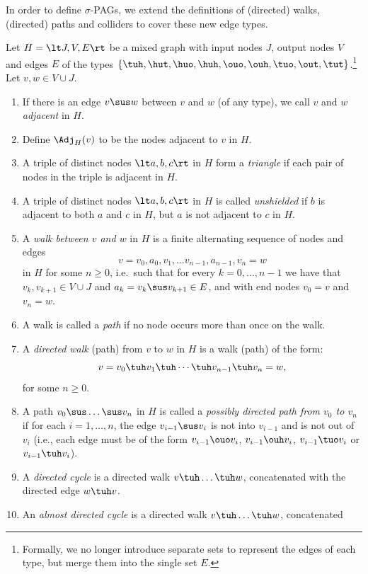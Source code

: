 In order to define $\sigma$-PAGs, we extend the definitions of (directed) walks, (directed) paths and colliders to cover these new edge types.
\begin{Def}\label{def:more_walks}
  Let $H=\lt J,V,E \rt$ be a mixed graph with input nodes $J$, output nodes $V$ and edges $E$ of the types $\{\tuh,\hut,\huo,\huh,\ouo,\ouh,\tuo,\out,\tut\}$.\footnote{Formally, we no longer introduce separate sets to represent the edges of each type, but merge them into the single set $E$.}
  Let $v,w \in V \cup J$.
  \begin{enumerate}
    \item If there is an edge $v \sus w$ between $v$ and $w$ (of any type), we call $v$ and $w$ \emph{adjacent} in $H$.
    \item Define $\Adj_H(v)$ to be the nodes adjacent to $v$ in $H$.
    \item A triple of distinct nodes $\lt a,b,c \rt$ in $H$ form a \emph{triangle} if each pair of nodes in the triple is adjacent in $H$.
    \item A triple of distinct nodes $\lt a,b,c \rt$ in $H$ is called \emph{unshielded} if $b$ is adjacent to both $a$ and $c$ in $H$, but $a$ is not adjacent to $c$ in $H$.
    \item A \emph{walk between $v$ and $w$} in $H$ is a finite alternating sequence of nodes and edges 
        \[v=v_0, a_0, v_1, \dots v_{n-1}, a_{n-1}, v_n=w\] 
        in $H$ for some $n \ge 0$, i.e.\ such that for every $k=0,\dots,n-1$ 
        we have that $v_{k},v_{k+1} \in V \cup J$ and $a_k = v_k \sus v_{k+1} \in E$, and with end nodes $v_0=v$ and $v_n=w$.
    \item A walk is called a \emph{path} if no node occurs more than once on the walk.
    \item A \emph{directed walk} (path) from $v$ to $w$ in $H$ is a walk (path) of the form:
        \[v=v_0 \tuh v_1 \tuh  \cdots \tuh v_{n-1} \tuh v_n=w,\]
        for some $n \ge 0$.
    \item A path $v_0 \sus \dots \sus v_n$ in $H$ is called a \emph{possibly directed path from $v_0$ to $v_n$} if for each $i=1,\dots,n$, the edge $v_{i-1} \sus v_i$ is not into $v_{i-1}$ and is not out of $v_i$ (i.e., each edge must be of the form $v_{i-1} \ouo v_i$, $v_{i-1} \ouh v_i$, $v_{i-1} \tuo v_i$ or $v_{i-1} \tuh v_i$).
    \item A \emph{directed cycle} is a directed walk $v \tuh \dots \tuh w$, concatenated with
      the directed edge $w \tuh v$.
    \item An \emph{almost directed cycle} is a directed walk $v \tuh \dots \tuh w$, concatenated

\end{enumerate}
\end{Def}
